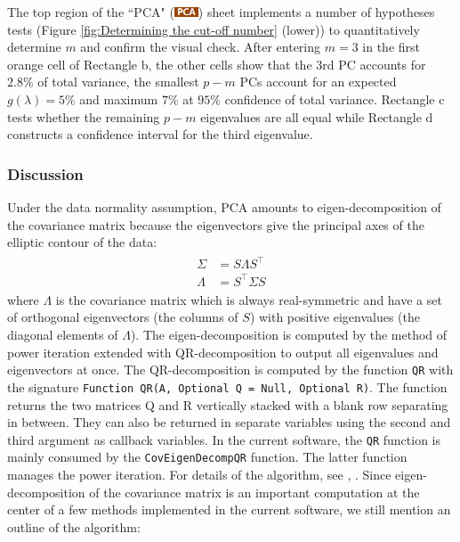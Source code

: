 \documentclass[article]{jss}
\numberwithin{equation}{subsection}
\newcommand{\shtPCA}{``PCA" (\includegraphics[height=8pt, keepaspectratio=true]{PcaSheetTab_png}) }
\begin{document}
        The top region of the \shtPCA sheet implements a number of hypotheses tests (Figure \ref{fig:Determining the cut-off number} (lower)) to quantitatively determine $m$ and confirm the visual check.         
        After entering $m=3$ in the first orange cell of Rectangle b, the other cells show that the 3rd PC accounts for $2.8\%$ of total variance, the smallest $p-m$ PCs account for an expected $g(\lambda)=5\%$ and maximum $7\%$ at $95\%$ confidence of total variance. Rectangle c tests whether the remaining $p-m$ eigenvalues are all equal while Rectangle d constructs a confidence interval for the third eigenvalue.
        
        \subsubsection{Discussion}Under the data normality assumption, PCA amounts to eigen-decomposition of the covariance matrix because the eigenvectors give the principal axes of the elliptic contour of the data: 
        \begin{align}
        \begin{split}
        \Sigma &= S\Lambda S^\intercal \\
        \Lambda &= S^\intercal \Sigma S 
        \end{split}
        \end{align}
        where $\Lambda$ is the covariance matrix which is always real-symmetric and have a set of orthogonal eigenvectors (the columns of $S$) with positive eigenvalues (the diagonal elements of $\Lambda$). The eigen-decomposition is computed by the method of power iteration extended with QR-decomposition to output all eigenvalues and eigenvectors at once. The QR-decomposition is computed by the  function \texttt{QR} with the signature \texttt{Function QR(A, Optional Q = Null, Optional R)}. The function returns the two matrices Q and R vertically stacked with a blank row separating in between. They can also be returned in separate variables using the second and third argument as callback variables. In the current software, the \texttt{QR} function is mainly consumed by the \texttt{CovEigenDecompQR} function. The latter function manages the power iteration. For details of the algorithm, see \cite{GolubVanLoan2012MatrixComputations4e}, \cite{SauerT2011NumericalAnalysis2e}. Since eigen-decomposition of the covariance matrix is an important computation at the center of a few methods implemented in the current software, we still mention an outline of the algorithm:
        
\end{document}
